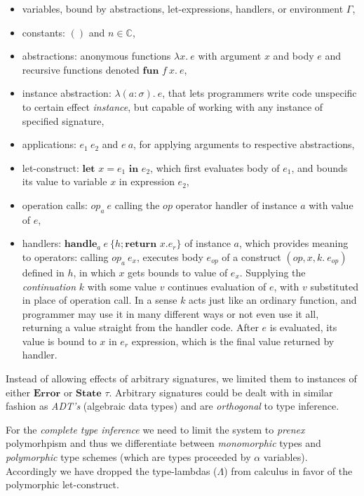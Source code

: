 \documentclass[declaration,shortabstract]{iithesis}
\theoremstyle{definition} \newtheorem{definition}{Definition}[section]
\newcommand{\lam}[1][x]{\ensuremath{\lambda #1.\:}}
\begin{document}
\begin{itemize}
    \item variables, bound by abstractions, let-expressions, handlers, or environment $\Gamma$,
    \item constants: $()$ and $n \in \mathbb{C}$,
    \item abstractions: anonymous functions $\lam e$ with argument $x$ and body $e$ and recursive functions denoted $\textbf{fun }f\:x.\:e$,
    \item instance abstraction: $\lam[(a:\sigma)]e$, that lets programmers write code
    unspecific to certain effect \textit{instance}, but capable of working with any
    instance of specified signature,
    \item applications: $e_1\:e_2$ and $e\:a$, for applying arguments to respective abstractions, 
    \item let-construct: $\textbf{let } x = e_1 \textbf{ in } e_2$, which first evaluates body of $e_1$,
    and bounds its value to variable $x$ in expression $e_2$,
    \item operation calls: $op_a\:e$ calling the $op$ operator handler of instance $a$ with value
    of $e$,
    \item handlers: $\textbf{handle}_a \: e\: \{h;\textbf{return } x. e_r\}$ of instance $a$, 
    which provides meaning to operators: calling $op_a\:e_x$, executes body $e_{op}$ of
    a construct $(op, x, k.\:e_{op})$ defined in $h$, in which $x$ gets bounds to value of $e_x$.
    Supplying the \textit{continuation} $k$ with some value $v$ continues evaluation of $e$,
    with $v$ substituted in place of operation call.
    In a sense $k$ acts just like an ordinary function, and programmer may use it
    in many different ways or not even use it all, returning a value straight from the handler code.
    After $e$ is evaluated, its value is bound to $x$ in $e_r$ expression,
    which is the final value returned by handler.

\end{itemize}

Instead of allowing effects of arbitrary signatures, we limited them to instances
of either $\textbf{Error}$ or  $\textbf{State }\tau$.
Arbitrary signatures could be dealt with in similar fashion as \textit{ADT's}
(algebraic data types) and are \textit{orthogonal} to type inference.

For the \textit{complete type inference} we need to limit the system to \textit{prenex}
polymorhpism and thus we differentiate between \textit{monomorphic} types and \textit{polymorphic}
type schemes (which are types proceeded by $\alpha$ variables).
Accordingly we have dropped the type-lambdas ($\Lambda$) from calculus in favor of the
polymorphic let-construct.
\end{document}
